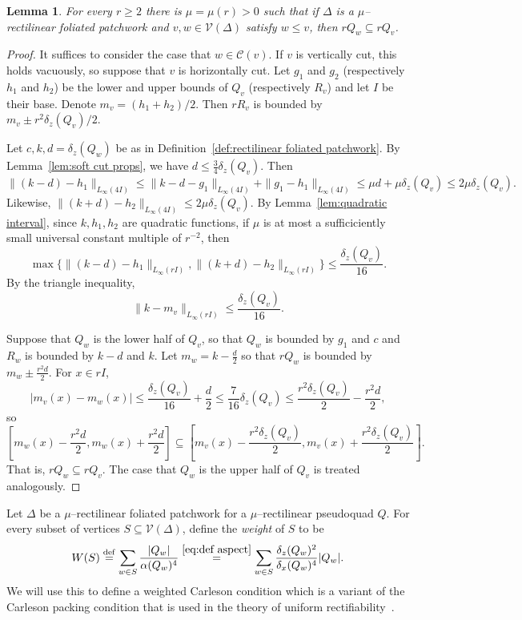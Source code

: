 \documentclass[11pt,reqno]{amsart}
\newcommand{\cC}{\mathcal{C}}
\newcommand{\cV}{\mathcal{V}}
\newcommand{\0}{\mathbf{0}}
\renewcommand{\1}{\mathbf 1}
\renewcommand{\subset}{\subseteq}
\newcommand{\eqdef}{\stackrel{\mathrm{def}}{=}}
\renewcommand{\ge}{\geqslant}
\renewcommand{\le}{\leqslant}
\newtheorem{lemma}[thm]{Lemma}
\theoremstyle{remark}
\begin{document}
\begin{lemma}\label{lem:child hierarchy}
  For every $r\ge 2$ there is  $\mu=\mu(r)>0$ such that if $\Delta$ is a $\mu$--rectilinear foliated patchwork and $v,w\in \cV(\Delta)$ satisfy $w\le v$, then $rQ_w\subset rQ_v$.
\end{lemma}
\begin{proof}
  It suffices to consider the case that $w\in \cC(v)$.  If $v$ is vertically cut, this holds vacuously, so suppose that $v$ is horizontally cut.  Let $g_1$ and $g_2$ (respectively $h_1$ and $h_2$) be the lower and upper bounds of $Q_v$ (respectively $R_v$) and let $I$ be their base.  Denote $m_v=(h_1+h_2)/2$.  Then $r R_v$ is bounded by $m_v \pm r^2\delta_z(Q_v)/2$.

  Let $c, k, d=\delta_z(Q_w)$ be as in Definition~\ref{def:rectilinear foliated patchwork}.  By Lemma~\ref{lem:soft cut props}, we have $d\le \frac{3}{4} \delta_z(Q_v)$.  Then
  $$\|(k-d)-h_1\|_{L_\infty(4I)} \le \|k-d-g_1\|_{L_\infty(4I)} + \|g_1-h_1\|_{L_\infty(4I)} \le  \mu d + \mu \delta_z(Q_v) \le 2\mu \delta_z(Q_v).$$
  Likewise, $\|(k+d)-h_2\|_{L_\infty(4I)}\le 2\mu \delta_z(Q_v)$.  By Lemma~\ref{lem:quadratic interval}, since $k,h_1,h_2$ are quadratic functions, if $\mu$ is at most a sufficiciently small universal constant multiple of $r^{-2}$, then
  $$\max\{\|(k-d)-h_1\|_{L_\infty(r I)}, \|(k+d)-h_2\|_{L_\infty(r I)}\}\le \frac{\delta_z(Q_v)}{16}.$$
  By the triangle inequality,
  $$\|k-m_v\|_{L_\infty(r I)} \le \frac{\delta_z(Q_v)}{16}.$$

  Suppose that $Q_w$ is the lower half of $Q_v$, so that $Q_w$ is bounded by $g_1$ and $c$ and $R_w$ is bounded by $k-d$ and $k$.  Let $m_w=k-\frac{d}{2}$ so that $rQ_w$ is bounded by $m_w \pm \frac{r^2d}{2}$.
  For $x\in r I$,
  $$\left|m_v(x)-m_w(x)\right| \le \frac{\delta_z(Q_v)}{16} + \frac{d}{2} \le \frac{7}{16} \delta_z(Q_v) \le \frac{r^2\delta_z(Q_v)}{2} - \frac{r^2 d}{2},$$
  so
  $$\left[m_w(x)-\frac{r^2d}{2}, m_w(x) + \frac{r^2d}{2}\right]\subset \left[m_v(x)-\frac{r^2\delta_z(Q_v)}{2}, m_v(x)+\frac{r^2\delta_z(Q_v)}{2}\right].$$
  That is, $rQ_w\subset r Q_v$.  The case that $Q_w$ is the upper half of $Q_v$ is treated analogously.
\end{proof}

Let $\Delta$ be a $\mu$--rectilinear foliated patchwork for a $\mu$--rectilinear pseudoquad $Q$. For every subset of vertices $S\subset \cV(\Delta)$, define the \emph{weight} of $S$ to be
\begin{equation}\label{eq:def weight}
W(S)\eqdef \sum_{w\in S} \frac{|Q_w|}{\alpha(Q_w)^{4}}\stackrel{\eqref{eq:def aspect}}{=} \sum_{w\in S} \frac{\delta_z(Q_w)^{2}}{\delta_x(Q_w)^{4}}|Q_w|.
\end{equation}
We will use this to define a weighted Carleson condition which is a variant of the Carleson packing condition that is used in the theory of uniform rectifiability~\cite{DSAnalysis}.
\end{document}
